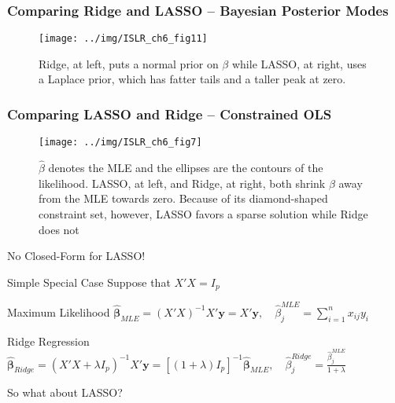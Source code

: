 \begin{frame}
  \frametitle{Comparing Ridge and LASSO -- Bayesian Posterior Modes}
    
\begin{figure}
	\centering
	\texttt{[image: ../img/ISLR\_ch6\_fig11]}
	\label{fig:ridge_lasso_prior}
  \caption{Ridge, at left, puts a normal prior on $\beta$ while LASSO, at right, uses a Laplace prior, which has fatter tails and a taller peak at zero.}
\end{figure}

\end{frame}
\begin{frame}
  \frametitle{Comparing LASSO and Ridge -- Constrained OLS}
  
\begin{figure}
	\centering
	\texttt{[image: ../img/ISLR\_ch6\_fig7]}
	\caption{$\widehat{\beta}$ denotes the MLE and the ellipses are the contours of the likelihood. 
LASSO, at left, and Ridge, at right, both shrink $\beta$ away from the MLE towards zero.
Because of its diamond-shaped constraint set, however, LASSO favors a \alert{sparse solution} while Ridge does not}
	\label{fig:ridge_lasso_constraint}
\end{figure}
\end{frame}
\begin{frame}
  {No Closed-Form for LASSO!}

  \small

  \begin{block}{Simple Special Case}
  Suppose that $X'X = I_p$
\end{block}
\begin{block}{Maximum Likelihood}
    $\widehat{\boldsymbol{\beta}}_{MLE} = (X'X)^{-1}X'\mathbf{y} = X'\mathbf{y}, \quad \widehat{\beta}_j^{MLE} = \sum_{i=1}^n x_{ij}y_i$ 
  \end{block}

  \begin{block}{Ridge Regression}
    $\widehat{\boldsymbol{\beta}}_{Ridge} = (X'X + \lambda I_p)^{-1}X'\mathbf{y} = \left[ (1 + \lambda) I_p \right]^{-1} \widehat{\boldsymbol{\beta}}_{MLE},\quad \widehat{\beta}^{Ridge}_j = \displaystyle \frac{\widehat{\beta}^{MLE}_j}{1 + \lambda}$
  \end{block}

  \begin{alertblock}{So what about LASSO?}
  \end{alertblock}
\end{frame}
